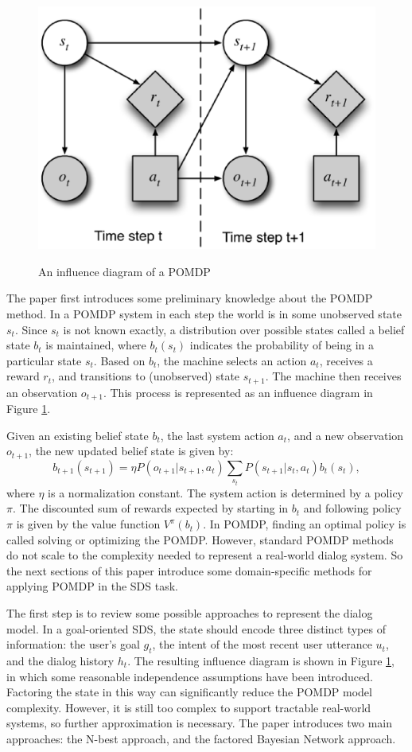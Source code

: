 \documentclass[paper=a4, fontsize=18pt]{article} %
\numberwithin{equation}{section} %
\numberwithin{figure}{section} %
\numberwithin{table}{section} %
\begin{document}
\begin{figure}[htbp]
  \centering
  \includegraphics[width=.5\linewidth]{10_17_POMDP2}\\
  \caption{An influence diagram of a POMDP}\label{fig:POMDP2}
\end{figure}

The paper first introduces some preliminary knowledge about the POMDP method. In a POMDP system in each step the world is in some unobserved state $s_t$. Since $s_t$ is not known exactly, a distribution over possible states called a belief state $b_t$ is maintained, where $b_t(s_t)$ indicates the probability of being in a particular state $s_t$. Based on $b_t$, the machine selects an action $a_t$, receives a reward $r_t$, and transitions to (unobserved) state $s_{t+1}$. The machine then receives an observation $o_{t+1}$. This process is represented as an influence diagram in Figure \ref{fig:POMDP2}.

Given an existing belief state $b_t$, the last system action $a_t$, and a new observation $o_{t+1}$, the new updated belief state is given by:
$$b_{t+1}(s_{t+1}) = \eta P(o_{t+1} | s_{t+1}, a_t) \sum_{s_t} P(s_{t+1} | s_t, a_t)  b_t(s_t),$$
where $\eta$ is a normalization constant. The system action is determined by a policy $\pi$. The discounted sum of rewards expected by starting in $b_t$ and following policy $\pi$ is given by the value function $V^\pi(b_t)$. In POMDP, finding an optimal policy is called solving or optimizing the POMDP. However, standard POMDP methods do not scale to the complexity needed to represent a real-world dialog system. So the next sections of this paper introduce some domain-specific methods for applying POMDP in the SDS task.

The first step is to review some possible approaches to represent the dialog model. In a goal-oriented SDS, the state should encode three distinct types of information: the user's goal $g_t$, the intent of the most recent user utterance $u_t$, and the dialog history $h_t$. The resulting influence diagram is shown in Figure \ref{fig:POMDP2}, in which some reasonable independence assumptions have been introduced. Factoring the state in this way can significantly reduce the POMDP model complexity. However, it is still too complex to support tractable real-world systems, so further approximation is necessary. The paper introduces two main approaches: the N-best approach, and the factored Bayesian Network approach.
\end{document}
